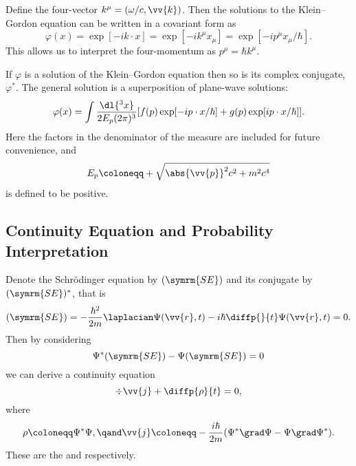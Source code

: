Define the four-vector \(k^\mu = (\omega/c, \vv{k})\).
Then the solutions to the Klein--Gordon equation can be written in a covariant form as
\begin{equation}
    \varphi(x) = \exp[-ik \cdot x] = \exp[-ik^\mu x_\mu] = \exp[-ip^\mu x_\mu/\hbar].
\end{equation}
This allows us to interpret the four-momentum as \(p^\mu = \hbar k^\mu\).

If \(\varphi\) is a solution of the Klein--Gordon equation then so is its complex conjugate, \(\varphi^*\).
The general solution is a superposition of plane-wave solutions:
\begin{equation}
    \varphi(x) = \int \frac{\dl{^3x}}{2E_p(2\pi)^3}[f(p)\exp[-ip\cdot x/\hbar] + g(p) \exp[ip\cdot x/\hbar]].
\end{equation}
Here the factors in the denominator of the measure are included for future convenience, and
\begin{equation}
    E_p \coloneqq +\sqrt{\abs{\vv{p}}^2c^2 + m^2c^4}
\end{equation}
is defined to be positive.

\subsection{Continuity Equation and Probability Interpretation}\label{sec:continuity equation}
Denote the Schrödinger equation by \((\symrm{SE})\) and its conjugate by \((\symrm{SE})^*\), that is
\begin{equation}
    (\symrm{SE}) = -\frac{\hbar^2}{2m} \laplacian \Psi(\vv{r}, t) - i\hbar\diffp{}{t}\Psi(\vv{r}, t) = 0.
\end{equation}
Then by considering
\begin{equation}
    \Psi^*(\symrm{SE}) - \Psi(\symrm{SE}) = 0
\end{equation}
we can derive a continuity equation
\begin{equation}
    \div\vv{j} + \diffp{\rho}{t} = 0,
\end{equation}
where
\begin{equation}
    \rho \coloneqq \Psi^*\Psi, \qand \vv{j} \coloneqq -\frac{i\hbar}{2m} (\Psi^*\grad \Psi - \Psi \grad \Psi^*).
\end{equation}
These are the  and  respectively.

